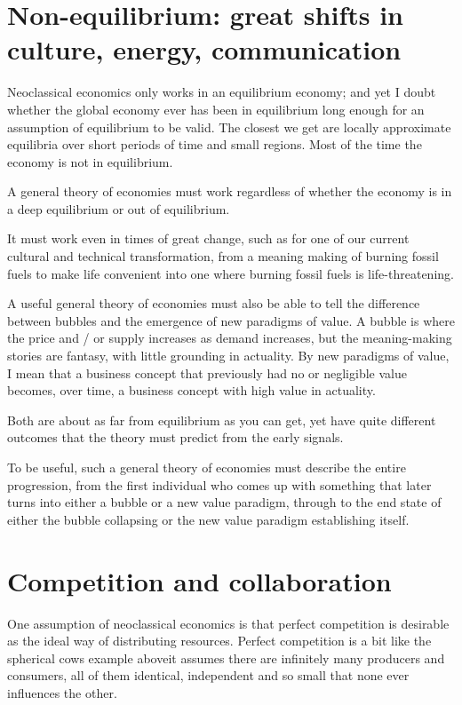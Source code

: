 \section[Non-equilibrium: great shifts]{Non-equilibrium: great shifts in culture, energy, communication}
Neoclassical economics  only works in an equilibrium economy\cite{earl-econocracy}; and yet I doubt whether the global economy ever has been in equilibrium long enough for an assumption of equilibrium  to be valid. The closest we get are locally approximate equilibria over short periods of time and small regions. Most of the time the economy is not in equilibrium.


A general theory of economies must work regardless of whether the economy is in a deep equilibrium or out of equilibrium.


It must work even in times of great change, such as for one of our current cultural and technical transformation, from a meaning making of burning fossil fuels  to make life convenient into one where burning fossil fuels is life-threatening.


A useful general theory of economies must also be able to tell the difference between bubbles\cite{carlin-macroeconomics}  and the emergence of new paradigms of value. A bubble is where the price and / or supply increases as demand increases, but the meaning-making stories are fantasy, with little grounding in actuality. By new paradigms of value, I mean that a business concept that previously had no or negligible value becomes, over time, a business concept with high value in actuality.


Both are about as far from equilibrium as you can get, yet have quite different outcomes that the theory must predict from the early signals. 


To be useful, such a general theory of economies must describe the entire progression, from the first individual who comes up with something that later turns into either a bubble or a new value paradigm, through to the end state of either the bubble collapsing or the new value paradigm establishing itself.






\section{Competition and collaboration}
One assumption of neoclassical economics  is that perfect competition is desirable as the ideal way of distributing resources. Perfect competition  is a bit like the spherical cows example above\textemdash it assumes there are infinitely many producers and consumers, all of them identical, independent and so small that none ever influences the other.


